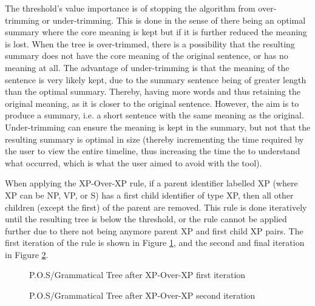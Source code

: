 \par The threshold's value importance is of stopping the algorithm from over-trimming or under-trimming. This is done in the sense of there being an optimal summary where the core meaning is kept but if it is further reduced the meaning is lost. When the tree is over-trimmed, there is a possibility that the resulting summary does not have the core meaning of the original sentence, or has no meaning at all. The advantage of under-trimming is that the meaning of the sentence is very likely kept, due to the summary sentence being of greater length than the optimal summary. Thereby, having more words and thus retaining the original meaning, as it is closer to the original sentence. However, the aim is to produce a summary, i.e. a short sentence with the same meaning as the original. Under-trimming can ensure the meaning is kept in the summary, but not that the resulting summary is optimal in size (thereby incrementing the time required by the user to view the entire timeline, thus increasing the time the to understand what occurred, which is what the user aimed to avoid with the tool).
\par When applying the XP-Over-XP rule, if a parent identifier labelled XP (where XP can be NP, VP, or S) has a first child identifier of type XP, then all other children (except the first) of the parent are removed. This rule is done iteratively until the resulting tree is below the threshold, or the rule cannot be applied further due to there not being anymore parent XP and first child XP pairs. The first iteration of the rule is shown in Figure \ref{tree:xpOverXpFirst}, and the second and final iteration in Figure \ref{tree:xpOverXpSecond}.
\begin{figure}[H]
\caption{P.O.S/Grammatical Tree after XP-Over-XP first iteration}
\label{tree:xpOverXpFirst}
\end{figure}
\begin{figure}[H]
\caption{P.O.S/Grammatical Tree after XP-Over-XP second iteration}
\label{tree:xpOverXpSecond}
\end{figure}
